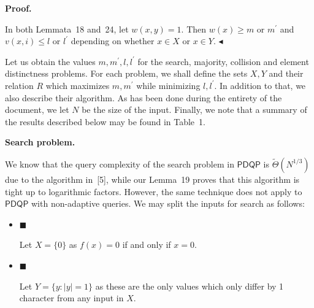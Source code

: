 


\par\medskip\noindent\textbf{Proof.}\par




In both Lemmata 18 and 24, let $w(x,y)=1$. Then $w(x)\geq m$ or $m^{\prime}$ and $v(x,i)\leq l$ or $l^{\prime}$ depending on whether $x\in X$ or $x\in Y$.
$\blacktriangleleft$\par




Let us obtain the values $m,m^{\prime},l,l^{\prime}$ for the search, majority, collision and element distinctness problems. For each problem, we shall define the sets $X,Y$ and their relation $R$ which maximizes $m,m^{\prime}$ while minimizing $l,l^{\prime}$. In addition to that, we also describe their algorithm. As has been done during the entirety of the document, we let $N$ be the size of the input. Finally, we note that a summary of the results described below may be found in Table 1.\par





\par\medskip\noindent\textbf{Search problem.}\par




We know that the query complexity of the search problem in $\mathsf{PDQP}$ is $\tilde{\Theta}(N^{1/3})$ due to the algorithm in [5], while our Lemma 19 proves that this algorithm is tight up to logarithmic factors. However, the same technique does not apply to $\mathsf{PDQP}$ with non-adaptive queries. We may split the inputs for search as follows:\par


\begin{itemize}


\item[] 
$\blacksquare$ 


Let $X=\{0\}$ as $f(x)=0$ if and only if $x=0$.\par





\item[] 
$\blacksquare$ 


Let $Y=\{y:|y|=1\}$ as these are the only values which only differ by 1 character from any input in $X$.\par





\end{itemize}




